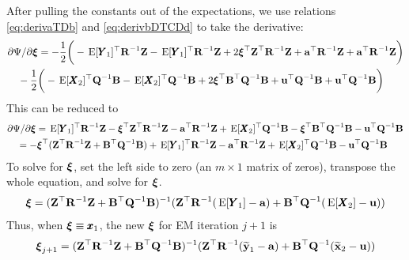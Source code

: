 \documentclass[]{article}
\def\xixi{\mbox{\boldmath $\xi$}}
\def\ZZ{\mbox{$\mathbf Z$}}	\def\zz{\mbox{$\mathbf z$}}
\def\BB{\mbox{$\mathbf B$}}	\def\bb{\mbox{$\mathbf b$}}
\def\QQ{\mbox{$\mathbf Q$}}	 \def\qq{\mbox{$\mathbf q$}}
\def\RR{\mbox{$\mathbf R$}}	 \def\rr{\mbox{$\mathbf r$}}
\def\XX{\mbox{$\pmb{X}$}}	\def\xx{\mbox{$\pmb{x}$}}
\def\YY{\mbox{$\pmb{Y}$}}	\def\yy{\mbox{$\pmb{y}$}}
\def\E{\,\textup{\textrm{E}}}
\begin{document}
After pulling the constants out of the expectations, we use relations \eqref{eq:derivaTDb} and \eqref{eq:derivbDTCDd} to take the derivative:
\begin{equation}\label{eq:pi.unconstrained.V0.is.0.t.1.1}
\begin{split}
&\partial\Psi/\partial\xixi = -\frac{1}{2} \bigg(-\E[\YY_1]^\top\RR^{-1}\ZZ - \E[ \YY_1]^\top\RR^{-1}\ZZ 
 + 2 \xixi^\top\ZZ^\top\RR^{-1}\ZZ + \aa^\top\RR^{-1}\ZZ  +  \aa^\top\RR^{-1}\ZZ \bigg) \\
&\quad-\frac{1}{2} \bigg(-\E[\XX_2]^\top\QQ^{-1}\BB - \E[ \XX_2]^\top\QQ^{-1}\BB 
 + 2 \xixi^\top\BB^\top\QQ^{-1}\BB + \uu^\top\QQ^{-1}\BB  +  \uu^\top\QQ^{-1}\BB \bigg) 
\end{split}
\end{equation}
This can be reduced to
\begin{equation}\label{}
\begin{split}
&\partial\Psi/\partial\xixi = \E[\YY_1]^\top\RR^{-1}\ZZ - \xixi^\top\ZZ^\top\RR^{-1}\ZZ - \aa^\top\RR^{-1}\ZZ 
 + \E[\XX_2]^\top\QQ^{-1}\BB - \xixi^\top\BB^\top\QQ^{-1}\BB - \uu^\top\QQ^{-1}\BB \\
&\quad =  - \xixi^\top(\ZZ^\top\RR^{-1}\ZZ + \BB^\top\QQ^{-1}\BB) + \E[\YY_1]^\top\RR^{-1}\ZZ - \aa^\top\RR^{-1}\ZZ 
+ \E[\XX_2]^\top\QQ^{-1}\BB - \uu^\top\QQ^{-1}\BB
\end{split}
\end{equation}
To solve for $\xixi$, set the left side to zero (an $m \times 1$ matrix of zeros), transpose the whole equation, and solve for $\xixi$.  
\begin{equation}\label{eq:pi.unconstrained.V0.is.0.t.1.2}
\begin{split}
\xixi = (\ZZ^\top\RR^{-1}\ZZ + \BB^\top\QQ^{-1}\BB)^{-1}(\ZZ^\top\RR^{-1}(\E[\YY_1]-\aa) +\BB^\top\QQ^{-1}(\E[\XX_2]  - \uu)) \\
\end{split}
\end{equation}
Thus, when $\xixi \equiv \xx_1$,  the new $\xixi$ for EM iteration $j+1$ is
\begin{equation}\label{eq:pi.unconstrained.V0.is.0.t.1.3}
\begin{split}
\xixi_{j+1} = (\ZZ^\top\RR^{-1}\ZZ + \BB^\top\QQ^{-1}\BB)^{-1}(\ZZ^\top\RR^{-1}(\widetilde{\mbox{$\mathbf y$}}_1-\aa) +\BB^\top\QQ^{-1}(\widetilde{\mbox{$\mathbf x$}}_2  - \uu))
\end{split}
\end{equation}
\end{document}
